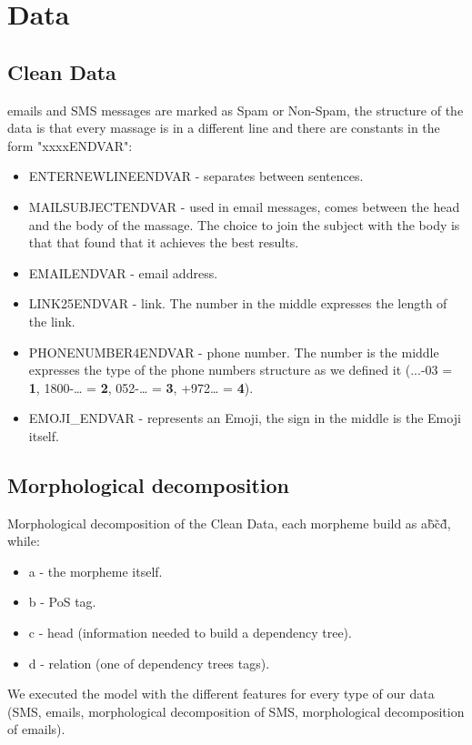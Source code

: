 \documentclass[11pt,a4paper]{article}
\begin{document}
\section{Data}
\subsection{Clean Data}
\label{ssec:Clean Data}
 emails and SMS messages are marked as Spam or Non-Spam, the structure of the data is that every massage is in a different line and there are constants in the form "xxxxENDVAR":
\begin{itemize}
\item ENTERNEWLINEENDVAR - separates between sentences.
\item MAILSUBJECTENDVAR - used in email messages, comes between the head and the body of the massage. The choice to join the subject with the body is that \citep{andrew2007scalable} that found that it achieves the best results.
\item EMAILENDVAR - email address.
\item LINK25ENDVAR - link. The number in the middle expresses the length of the link.
\item PHONENUMBER4ENDVAR - phone number. The number is the middle expresses the type of the phone numbers structure as we defined it 
(...-03 = \textbf{1}, 1800-… = \textbf{2}, 052-… = \textbf{3}, +972… = \textbf{4}).
\item EMOJI\_ENDVAR - represents an Emoji, the sign in the middle is the Emoji itself.
\end{itemize}

\subsection{Morphological decomposition}
\label{ssec:Morphological decomposition}
Morphological decomposition of the Clean Data, each morpheme build as a\~b\~c\~d, while:
\begin{itemize}
\item a - the morpheme itself.
\item b - PoS tag.
\item c - head (information needed to build a dependency tree).
\item d - relation (one of dependency trees tags).
\end{itemize}
\noident We executed the model with the different features for  every type of our data (SMS, emails, morphological decomposition of SMS, morphological decomposition of emails).
\end{document}
